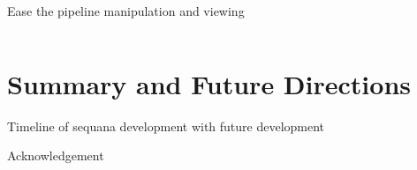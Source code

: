 \documentclass{beamer}
\begin{document}
\begin{frame}{Ease the pipeline manipulation and viewing}
\begin{columns}
\begin{column}{0.5\textwidth}

        \end{column}

    \end{columns}
\end{frame}

\section{Summary and Future Directions}

\begin{frame}
    Timeline of sequana development with future development
\end{frame}

\begin{frame}{Acknowledgement}
\end{frame}
\end{document}
